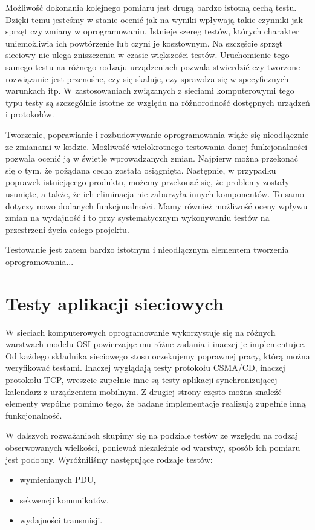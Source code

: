 \documentclass[00-praca-magisterska.tex]{subfiles}
\begin{document}
Możliwość dokonania kolejnego pomiaru jest drugą bardzo istotną cechą testu.
Dzięki temu jesteśmy w stanie ocenić jak na wyniki wpływają takie czynniki jak
sprzęt czy zmiany w oprogramowaniu. Istnieje szereg testów, których charakter
uniemożliwia ich powtórzenie lub czyni je kosztownym. Na szczęście sprzęt
sieciowy nie ulega zniszczeniu w czasie większości testów. Uruchomienie tego
samego testu na różnego rodzaju urządzeniach pozwala stwierdzić czy tworzone
rozwiązanie jest przenośne, czy się skaluje, czy sprawdza się w specyficznych
warunkach itp. W zastosowaniach związanych z sieciami komputerowymi tego typu
testy są szczególnie istotne ze względu na różnorodność dostępnych urządzeń i
protokołów.

Tworzenie, poprawianie i rozbudowywanie oprogramowania wiąże się nieodłącznie
ze zmianami w kodzie. Możliwość wielokrotnego testowania danej funkcjonalności
pozwala ocenić ją w świetle wprowadzanych zmian. Najpierw można przekonać się o
tym, że pożądana cecha została osiągnięta. Następnie, w przypadku poprawek
istniejącego produktu, możemy przekonać się, że problemy zostały usunięte, a
także, że ich eliminacja nie zaburzyła innych komponentów. To samo dotyczy nowo
dodanych funkcjonalności. Mamy również możliwość oceny wpływu zmian na
wydajność i to przy systematycznym wykonywaniu testów na przestrzeni życia
całego projektu.


Testowanie jest zatem bardzo istotnym i nieodłącznym elementem tworzenia oprogramowania...

\section{Testy aplikacji sieciowych}

W sieciach komputerowych oprogramowanie wykorzystuje się na różnych warstwach
modelu OSI powierzając mu różne zadania i inaczej je implementujec. Od każdego
składnika sieciowego stosu oczekujemy poprawnej pracy, którą można weryfikować
testami. Inaczej wyglądają testy protokołu CSMA/CD, inaczej protokołu TCP,
wreszcie zupełnie inne są testy aplikacji synchronizującej kalendarz z
urządzeniem mobilnym. Z drugiej strony często można znaleźć elementy wspólne
pomimo tego, że badane implementacje realizują zupełnie inną funkcjonalność.

W dalszych rozważaniach skupimy się na podziale testów ze względu na rodzaj
obserwowanych wielkości, ponieważ niezależnie od warstwy, sposób ich pomiaru
jest podobny. Wyróżniliśmy następujące rodzaje testów:
\begin{itemize}
  \item wymienianych PDU,
  \item sekwencji komunikatów,
  \item wydajności transmisji.
\end{itemize}
\end{document}
